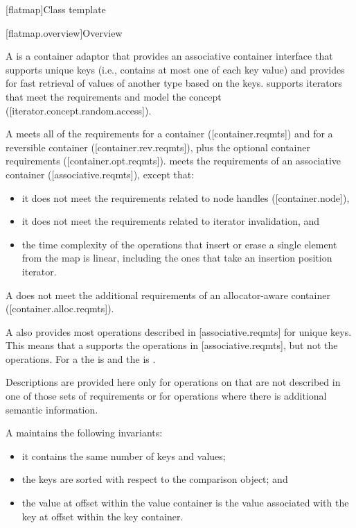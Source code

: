 \setcounter{subsection}{7}
\begin{addedblock}
[flatmap]{Class template }

[flatmap.overview]{Overview}

\pnum
{}%
A  is a container adaptor that provides an associative
container interface that supports unique keys (i.e., contains at most one of each
key value) and provides for fast retrieval of values of another type 
based on the keys.  supports iterators that meet the
 requirements and model the 
concept ([iterator.concept.random.access]).

\pnum
A  meets all of the requirements for a container
([container.reqmts]) and for a reversible container ([container.rev.reqmts]),
plus the optional container requirements ([container.opt.reqmts]).  
meets the requirements of an associative container ([associative.reqmts]), except that:
\begin{itemize}
\item it does not meet the requirements related to node handles ([container.node]),
\item it does not meet the requirements related to iterator invalidation, and
\item the time complexity of the operations that insert or erase a single
element from the map is linear, including the ones that take an insertion
position iterator.
\end{itemize}
\begin{note}A  does not meet the additional requirements of an
allocator-aware container ([container.alloc.reqmts]).\end{note}

\pnum
A  also provides most operations described
in [associative.reqmts] for unique keys.  This means that a
 supports the  operations
in [associative.reqmts], but not the  operations.  For
a  the  is  and the
 is .

\pnum
Descriptions are provided here only for operations on  that
are not described in one of those sets of requirements or for operations where
there is additional semantic information.

\pnum
A  maintains the following invariants:
\begin{itemize}
\item it contains the same number of keys and values;
\item the keys are sorted with respect to the comparison object; and
\item the value at offset  within the value container is the value associated with the key at offset  within the key container.
\end{itemize}


\end{addedblock}
